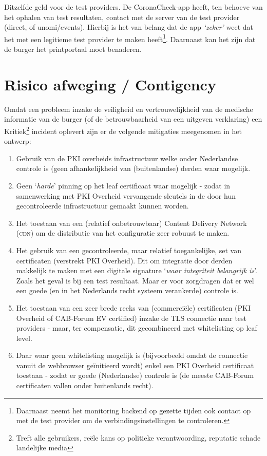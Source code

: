 \documentclass[11.0pt]{report}
\def\CoronaCheckApp{CoronaCheck-app\xspace}
\begin{document}
Ditzelfde geld voor de test providers.
\fi
De \CoronaCheckApp heeft, ten behoeve van het ophalen van test resultaten, contact met de server van de test provider (direct, of unomi/events). Hierbij is het van belang dat de app \emph{`zeker'} weet dat het met een legitieme test provider te maken heeft\footnote{Daarnaast neemt het monitoring backend op gezette tijden ook contact op met de test provider om de verbindingsinstellingen te controleren.}. Daarnaast kan het zijn dat de burger het printportaal moet benaderen.

\section{Risico afweging / Contigency}

Omdat een probleem inzake de veiligheid en vertrouwelijkheid van de medische informatie van de burger (of de betrouwbaarheid van een uitgeven verklaring) een  Kritiek\footnote{Treft alle gebruikers, reële kans op politieke verantwoording, reputatie schade landelijke media} incident oplevert zijn er de volgende mitigaties meegenomen in het ontwerp:

\begin{enumerate}
\item Gebruik van de PKI overheids infrastructuur welke onder Nederlandse controle is (geen afhankelijkheid van (buitenlandse) derden waar mogelijk.
\ifdefined\testsonly
\else\item Geen `\emph{harde}' pinning op het leaf certificaat waar mogelijk - zodat in samenwerking met PKI Overheid vervangende sleutels in de door hun gecontroleerde infrastructuur gemaakt kunnen worden.
\item Het toestaan van een (relatief onbetrouwbaar) Content Delivery Network (\textsc{cdn}) om de distributie van het configuratie zeer robuust te maken.
\fi
\item Het gebruik van een gecontroleerde, maar relatief toegankelijke, set van certificaten (verstrekt PKI Overheid). Dit om integratie door derden makkelijk te maken met een digitale signature `\emph{waar integriteit belangrijk is}'. Zoals het geval is bij een test resultaat. Maar er voor zorgdragen dat er wel een goede (en in het Nederlands recht systeem verankerde) controle is.
\item Het toestaan van een zeer brede reeks van (commerciële) certificaten (PKI Overheid of CAB-Forum EV certified) inzake de TLS connectie naar test providers - maar, ter compensatie, dit gecombineerd met whitelisting op leaf level.
\item Daar waar geen whitelisting mogelijk is (bijvoorbeeld omdat de connectie vanuit de webbrowser geïnitieerd wordt) enkel een PKI Overheid certificaat toestaan - zodat er goede (Nederlandse) controle is (de meeste CAB-Forum certificaten vallen onder buitenlands recht).
\end{enumerate}
\end{document}
